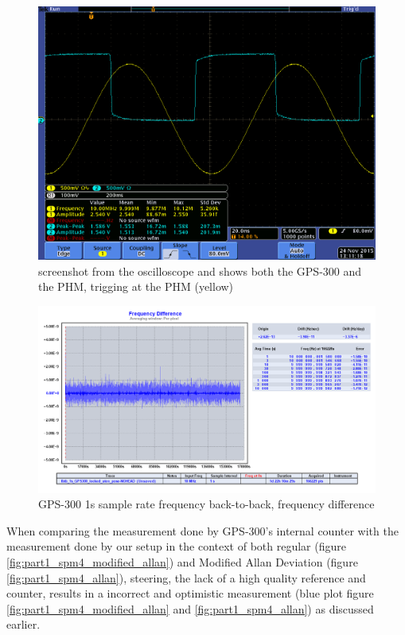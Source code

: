\documentclass[11pt,english,a4paper]{article}
\begin{document}
\begin{figure}[!htb]
  \centering
    \includegraphics[width=1\textwidth]{tek00006.png}
      \caption{screenshot from the oscilloscope and shows both the GPS-300 and the PHM, trigging at the PHM (yellow)}
          \label{fig:tek00006}
\end{figure}

\begin{figure}[!htb]
  \centering
    \includegraphics[width=1\textwidth]{part1_spm5_freq_diff.png}
      \caption{GPS-300 1s sample rate frequency back-to-back, frequency difference}
          \label{fig:part1_spm5_freq_diff}
\end{figure}

\newpage
When comparing the measurement done by GPS-300's internal counter with the measurement done by our setup in the context of both regular (figure \ref{fig:part1_spm4_modified_allan}) and Modified Allan Deviation (figure \ref{fig:part1_spm4_allan}), steering, the lack of a high quality reference and counter, results in a incorrect and optimistic measurement (blue plot figure \ref{fig:part1_spm4_modified_allan} and \ref{fig:part1_spm4_allan}) as discussed earlier.  
\end{document}

